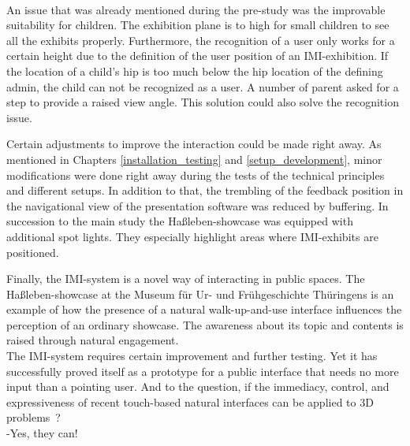 \\
An issue that was already mentioned during the pre-study was the improvable suitability for children. The exhibition plane is to high for small children to see all the exhibits properly. Furthermore, the recognition of a user only works for a certain height due to the definition of the user position of an \ac{IMI}-exhibition. If the location of a child's hip is too much below the hip location of the defining admin, the child can not be recognized as a user. A number of parent asked for a step to provide a raised view angle. This solution could also solve the recognition issue.

Certain adjustments to improve the interaction could be made right away. As mentioned in Chapters \ref{installation_testing} and \ref{setup_development}, minor modifications were done right away during the tests of the technical principles and different setups. In addition to that, the trembling of the feedback position in the navigational view of the presentation software was reduced by buffering. In succession to the main study the Haßleben-showcase was equipped with additional spot lights. They especially highlight areas where \ac{IMI}-exhibits are positioned.   

Finally, the \ac{IMI}-system is a novel way of interacting in public spaces. The Haßleben-showcase at the Museum für Ur- und Frühgeschichte Thüringens is an example of how the presence of a natural walk-up-and-use interface influences the perception of an ordinary showcase. The awareness about its topic and contents is raised through natural engagement. 
\\
The \ac{IMI}-system requires certain improvement and further testing. Yet it has successfully proved itself as a prototype for a public interface that needs no more input than a pointing user. And to the question, if the immediacy, control, and expressiveness of recent touch-based natural interfaces can be applied to 3D problems~\cite{ForewordCnG}?\\
-Yes, they can!

%
